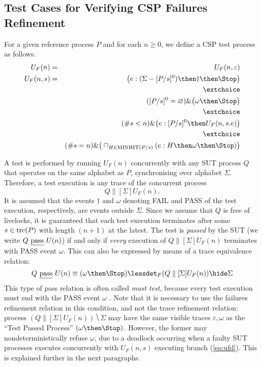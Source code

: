 \subsection{Test Cases for Verifying CSP Failures Refinement}

For a given reference process $P$ and for each $n\ge 0$, 
we define a CSP test process as follows. 
\begin{eqnarray}
U_F(n) & = & U_F(n,\varepsilon)
\\
U_F(n,s) & = & \big( e:(\Sigma - [P/s]^0) \then \dag\then \Stop \big)
\label{eq:ufa}
\\ & & \extchoice \nonumber
\\ & & ([P/s]^0 = \varnothing)    \&   \big( \omega \then \Stop \big)
\label{eq:ufb}
\\ & & \extchoice \nonumber
\\ & & (\#s < n) \& \big( e:[P/s]^0 \then U_F(n,s.e) \big)
\label{eq:ufc}
\\ & & \extchoice \nonumber
\\ & & (\#s = n) \& \big( \sqcap_{H\in\text{MINHIT}(P/s)} ( e:H \then \omega \then\Stop   )  \big)
\label{eq:ufd}
\end{eqnarray}

A test is performed by running $U_F(n)$ concurrently with any SUT process $Q$
that operates on the same alphabet as $P$, synchronising over
alphabet $\Sigma$. Therefore, a test execution is any trace of the concurrent process
\[
Q\parallel[\Sigma] U_F(n).
\]
It is assumed that the events $\dag$ and $\omega$ denoting FAIL and PASS of the test execution, respectively, are events outside $\Sigma$.
Since we assume that $Q$ is free of livelocks, it is guaranteed that each test execution terminates after some $s\in\text{trc}(P)$ with length $(n+1)$ at the latest. 
The test is \emph{passed} by the SUT (we write $Q\ \underline{\text{pass}}\ U(n)$) if and only if {\it every} execution of $Q\parallel[\Sigma] U_F(n)$ terminates with PASS event $\omega$. This can also be  expressed by means of a trace equivalence relation:
\[
Q\ \pass\ U(n) \equiv (\omega\then\Stop) \lessdet_F (Q\parallel[\Sigma] U_F(n)) \hide \Sigma  
\]
This type of pass relation is often called \emph{must test}, because every test execution must end with the PASS event $\omega$ \cite{Hennessy:1988:ATP:50497}. Note that it
is necessary to use the failures refinement relation in this condition, and not the trace refinement relation: process $(Q\parallel[\Sigma] U_F(n)) \hide \Sigma$ may have  the same visible traces $\varepsilon, \omega$ as the ``Test Passed Process'' $(\omega\then\Stop)$. However,
the former may nondeterministically refuse $\omega$, due to a deadlock occurring when
a faulty SUT processes executes concurrently with $U_F(n,s)$ executing branch (\ref{eq:ufd}). This is explained further in the next paragraphs.


